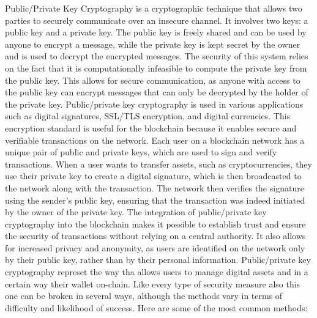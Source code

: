 \documentclass[target=mst,aauheader=]{thud}
\begin{document}
    Public/Private Key Cryptography is a cryptographic technique that allows two parties to securely communicate over an insecure channel. It involves two keys: a public key and a private key. The public key is freely shared and can be used by anyone to encrypt a message, while the private key is kept secret by the owner and is used to decrypt the encrypted messages. The security of this system relies on the fact that it is computationally infeasible to compute the private key from the public key. This allows for secure communication, as anyone with access to the public key can encrypt messages that can only be decrypted by the holder of the private key. Public/private key cryptography is used in various applications such as digital signatures, SSL/TLS encryption, and digital currencies.
    This encryption standard is useful for the blockchain because it enables secure and verifiable transactions on the network. Each user on a blockchain network has a unique pair of public and private keys, which are used to sign and verify transactions.  When a user wants to transfer assets, such as cryptocurrencies, they use their private key to create a digital signature, which is then broadcasted to the network along with the transaction. The network then verifies the signature using the sender's public key, ensuring that the transaction was indeed initiated by the owner of the private key. The integration of public/private key cryptography into the blockchain makes it possible to establish trust and ensure the security of transactions without relying on a central authority. It also allows for increased privacy and anonymity, as users are identified on the network only by their public key, rather than by their personal information.
    Public/private key cryptography represet the way tha allows users to manage digital assets and in a certain way their wallet on-chain. Like every type of security measure also this one can be broken in several ways, although the methods vary in terms of difficulty and likelihood of success. Here are some of the most common methods:
\end{document}
